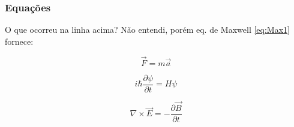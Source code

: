 \documentclass{beamer}
\begin{document}
\begin{frame}[fragile]
\frametitle{Equações}
O que ocorreu na linha acima? Não entendi, porém 
eq. de Maxwell \ref{eq:Max1} fornece:

\begin{equation}\label{eq:2LN} 
 \vec{F} = m \vec{a}
\end{equation} 

\begin{equation}\label{eq:Sch} 
 i \hbar \frac{\partial \psi}{\partial t} = H \psi
\end{equation} 

\begin{equation}\label{eq:Max1} 
 \nabla \times \vec{E} = - \frac{\partial \vec{B}}{\partial t}
\end{equation} 
\end{frame}
\end{document}

